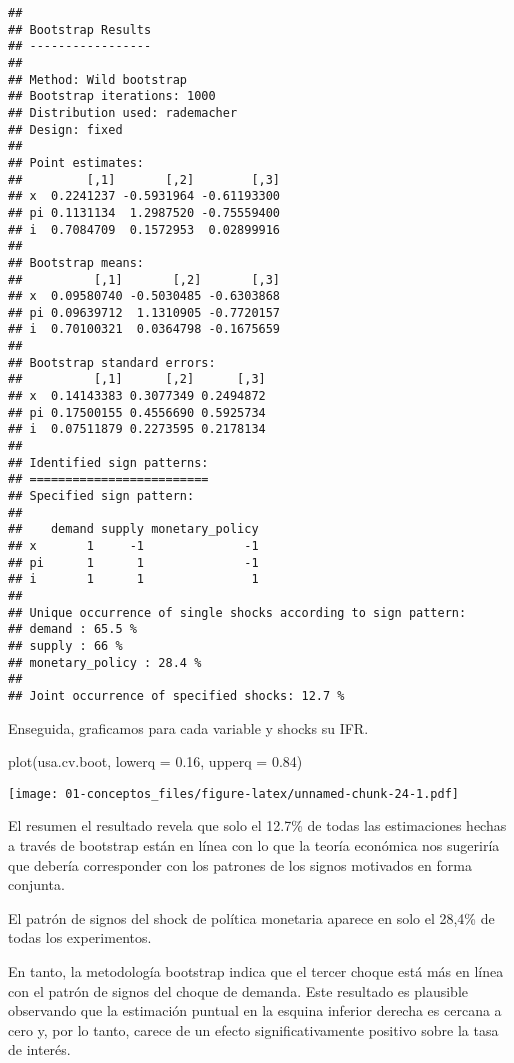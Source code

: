\documentclass[
]{book}
\newenvironment{Shaded}{\begin{snugshade}}{\end{snugshade}}
\newcommand{\AttributeTok}[1]{\textcolor[rgb]{0.77,0.63,0.00}{#1}}
\newcommand{\FloatTok}[1]{\textcolor[rgb]{0.00,0.00,0.81}{#1}}
\newcommand{\FunctionTok}[1]{\textcolor[rgb]{0.00,0.00,0.00}{#1}}
\newcommand{\NormalTok}[1]{#1}
\begin{document}
\begin{verbatim}
## 
## Bootstrap Results
## ----------------- 
## 
## Method: Wild bootstrap
## Bootstrap iterations: 1000
## Distribution used: rademacher
## Design: fixed
## 
## Point estimates: 
##         [,1]       [,2]        [,3]
## x  0.2241237 -0.5931964 -0.61193300
## pi 0.1131134  1.2987520 -0.75559400
## i  0.7084709  0.1572953  0.02899916
## 
## Bootstrap means: 
##          [,1]       [,2]       [,3]
## x  0.09580740 -0.5030485 -0.6303868
## pi 0.09639712  1.1310905 -0.7720157
## i  0.70100321  0.0364798 -0.1675659
## 
## Bootstrap standard errors: 
##          [,1]      [,2]      [,3]
## x  0.14143383 0.3077349 0.2494872
## pi 0.17500155 0.4556690 0.5925734
## i  0.07511879 0.2273595 0.2178134
## 
## Identified sign patterns: 
## =========================
## Specified sign pattern: 
## 
##    demand supply monetary_policy
## x       1     -1              -1
## pi      1      1              -1
## i       1      1               1
## 
## Unique occurrence of single shocks according to sign pattern: 
## demand : 65.5 % 
## supply : 66 % 
## monetary_policy : 28.4 % 
## 
## Joint occurrence of specified shocks: 12.7 %
\end{verbatim}

Enseguida, graficamos para cada variable y shocks su IFR.

\begin{Shaded}
\begin{Highlighting}[]
\FunctionTok{plot}\NormalTok{(usa.cv.boot, }\AttributeTok{lowerq =} \FloatTok{0.16}\NormalTok{, }\AttributeTok{upperq =} \FloatTok{0.84}\NormalTok{)}
\end{Highlighting}
\end{Shaded}

\texttt{[image: 01-conceptos\_files/figure-latex/unnamed-chunk-24-1.pdf]}

El resumen el resultado revela que solo el 12.7\% de todas las estimaciones hechas a través de bootstrap están en línea con lo que la teoría económica nos sugeriría que debería corresponder con los patrones de los signos motivados en forma conjunta.

El patrón de signos del shock de política monetaria aparece en solo el 28,4\% de todas los experimentos.

En tanto, la metodología bootstrap indica que el tercer choque está más en línea con el patrón de signos del choque de demanda. Este resultado es plausible observando que la estimación puntual en la esquina inferior derecha es cercana a cero y, por lo tanto, carece de un efecto significativamente positivo sobre la tasa de interés.
\end{document}
